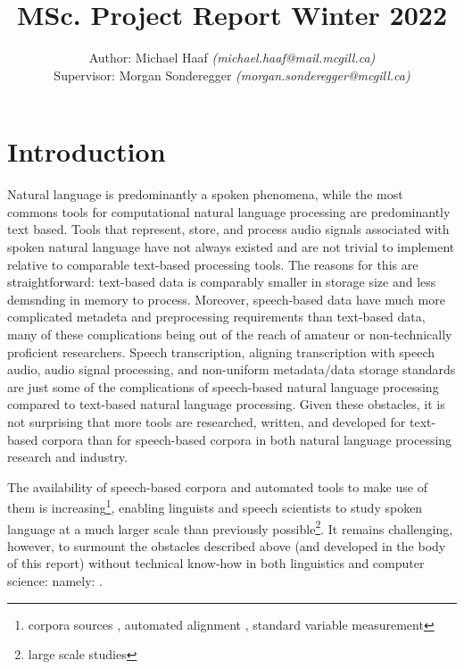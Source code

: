\documentclass[11pt]{article}
\begin{document}
\title{MSc. Project Report Winter 2022}
\author{Author: Michael Haaf \textit{(michael.haaf@mail.mcgill.ca)} \\ Supervisor: Morgan Sonderegger \textit{(morgan.sonderegger@mcgill.ca)}}

\maketitle
\begin{singlespace}
\tableofcontents
\end{singlespace}

\section{Introduction}

\nocite{*}

Natural language is predominantly a spoken phenomena, while the most commons tools for computational natural language processing are predominantly text based. Tools that represent, store, and process audio signals associated with spoken natural language have not always existed and are not trivial to implement relative to comparable text-based processing tools. The reasons for this are straightforward: text-based data is comparably smaller in storage size and less demsnding in memory to process. Moreover, speech-based data have much more complicated metadeta and preprocessing requirements than text-based data, many of these complications being out of the reach of amateur or non-technically proficient researchers. Speech transcription, aligning transcription with speech audio, audio signal processing, and non-uniform metadata/data storage standards are just some of the complications of speech-based natural language processing compared to text-based natural language processing. Given these obstacles, it is not surprising that more tools are researched, written, and developed for text-based corpora than for speech-based corpora in both natural language processing research and industry.

The availability of speech-based corpora and automated tools to make use of them is increasing\footnote{corpora sources , automated alignment , standard variable measurement }, enabling linguists and speech scientists to study spoken language at a much larger scale than previously possible\footnote{large scale studies}. It remains challenging, however, to surmount the obstacles described above (and developed in the body of this report) without technical know-how in both linguistics and computer science: namely: .
\end{document}
